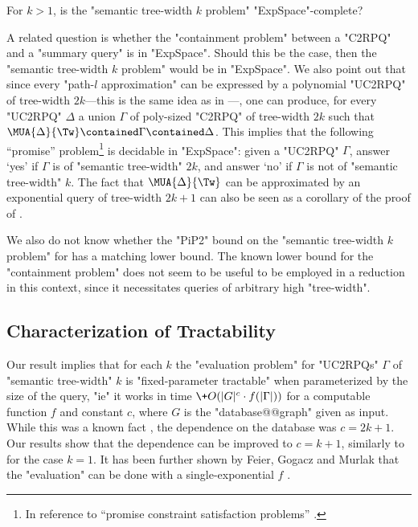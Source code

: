 \begin{question}
    For $k > 1$, is the "semantic tree-width $k$ problem" "ExpSpace"-complete?
\end{question}
A related question is whether the "containment problem" between a "C2RPQ" and a "summary query" is in "ExpSpace". Should this be the case, then the "semantic tree-width $k$ problem" would be in "ExpSpace".
We also point out that since every "path-$l$ approximation" can be expressed by a polynomial "UC2RPQ" of tree-width $2k$---this is the same idea as in \cite[Lemma IV.13]{RomeroBarceloVardi2017Homomorphism}---, one can produce, for every "UC2RPQ" $\Delta$ a union $\Gamma$ of poly-sized "C2RPQ" of tree-width $2k$ such that $ \MUA{\Delta}{\Tw} \contained \Gamma \contained \Delta$. This implies that the following ``promise'' problem\footnote{In reference to ``promise constraint satisfaction problems''
\cite[Definition 2.3]{BrakensiekGuruswami2021PCSP}.} is decidable in "ExpSpace": given a "UC2RPQ" $\Gamma$, answer `yes' if $\Gamma$ is of "semantic tree-width" $2k$, and answer `no' if $\Gamma$ is not of "semantic tree-width" $k$. The fact that $\MUA{\Delta}{\Tw}$ can be approximated by an exponential query of tree-width $2k+1$ can also be seen as a corollary of the proof of \cite[Theorem~V.1]{RomeroBarceloVardi2017Homomorphism}.

We also do not know whether the {"PiP2"} bound on the "semantic tree-width $k$ problem" for {\UCRPQSRE} has a matching lower bound. The known lower bound for the {\UCRPQSRE} "containment problem" \cite[Theorem~5.1]{FigueiraEtal2020Containment} does not seem to be useful to be employed in a reduction in this context, since it necessitates queries of arbitrary high "tree-width".

\subsection{Characterization of Tractability}
\label{sec:charact-tractability}

Our result implies that for each $k$
the "evaluation problem" for "UC2RPQs" $\Gamma$
of "semantic tree-width" $k$ is "fixed-parameter tractable" when parameterized
by the size of the query, "ie" it works in time $\+O(|G|^{c} \cdot f(|\Gamma|))$
for a computable function $f$ and constant $c$, where $G$ is the "database@@graph" given as input.
%
While this was a known fact \cite[Corollary IV.12]{RomeroBarceloVardi2017Homomorphism}, the dependence on the database was $c=2k+1$.  Our results show that the dependence can be improved to $c=k+1$, similarly to \cite[Theorem 6.3]{BarceloRomeroVardi2016SemanticAcyclicity} for the case $k=1$.
It has been further shown by Feier, Gogacz and Murlak that the "evaluation" can be done with a single-exponential $f$ \cite[Theorem~22]{FeierGogaczMurlak24Treewidth}.

